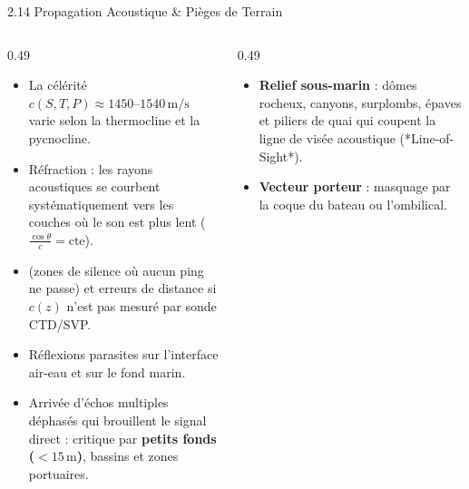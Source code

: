 \begin{frame}{2.14 Propagation Acoustique \& Pièges de Terrain}
  \begin{columns}[T]
    \begin{column}{0.49\textwidth}
      \begin{block}{}
        \scriptsize
        \begin{itemize}
          \item La célérité $c(S,T,P) \approx 1450\text{--}1540\,\text{m/s}$ varie selon la thermocline et la pycnocline.
          \item Réfraction : les rayons acoustiques se courbent systématiquement vers les couches où le son est plus lent ($\frac{\cos\theta}{c} = \text{cte}$).
          \item {} (zones de silence où aucun ping ne passe) et erreurs de distance si $c(z)$ n'est pas mesuré par sonde CTD/SVP.
        \end{itemize}
      \end{block}

      \begin{block}{}
        \scriptsize
        \begin{itemize}
          \item Réflexions parasites sur l'interface air-eau et sur le fond marin.
          \item Arrivée d'échos multiples déphasés qui brouillent le signal direct : critique par \textbf{petits fonds ($<15\,\text{m}$)}, bassins et zones portuaires.
        \end{itemize}
      \end{block}
    \end{column}

    \begin{column}{0.49\textwidth}
      \begin{block}{}
        \scriptsize
        \begin{itemize}
          \item \textbf{Relief sous-marin} : dômes rocheux, canyons, surplombs, épaves et piliers de quai qui coupent la ligne de visée acoustique (*Line-of-Sight*).
          \item \textbf{Vecteur porteur} : masquage par la coque du bateau ou l'ombilical.
        \end{itemize}
      \end{block}


\end{column}
\end{columns}
\end{frame}

